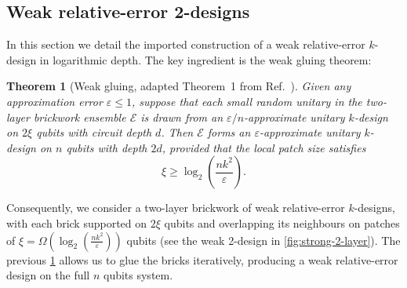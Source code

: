 \documentclass[
    aps,
    superscriptaddress,
    onecolumn,
    10pt,
    prx,
    nofootinbib
]{revtex4-2}
\newtheorem{theorem}{Theorem}
\theoremstyle{namedstatement}
\theoremstyle{plain}
\begin{document}
\subsection{Weak relative-error 2-designs}
\label{app:apendix_relativeerr_twodesign}
In this section we detail the imported construction of a weak relative-error $k$-design in logarithmic depth. The key ingredient is the weak gluing theorem:
\begin{theorem}[Weak gluing, adapted Theorem~1 from Ref.~\cite{SchusterHaferkampHuang2025}]
\label{thm:gluing-small-designs}
Given any approximation error $\varepsilon \leq 1$, suppose that each small random unitary in the two-layer brickwork ensemble $\mathcal{E}$ is drawn from an $\varepsilon/n$-approximate unitary $k$-design on $2\xi$ qubits with circuit depth $d$. Then $\mathcal{E}$ forms an $\varepsilon$-approximate unitary $k$-design on $n$ qubits with depth $2d$, provided that the local patch size satisfies
\begin{equation}
    \xi \geq \log_2\left(\frac{nk^2}{\varepsilon}\right).
\end{equation}
\end{theorem}
Consequently, we consider a two-layer brickwork of weak relative-error $k$-designs, with each brick supported on $2\xi$ qubits and overlapping its neighbours on patches of $\xi =\Omega( \log_2\left(\frac{nk^2}{\varepsilon}\right))$ qubits (see the weak 2-design in \cref{fig:strong-2-layer}). The previous \cref{thm:gluing-small-designs} allows us to glue the bricks iteratively, producing a weak relative-error design on the full $n$ qubits system. 
\end{document}
